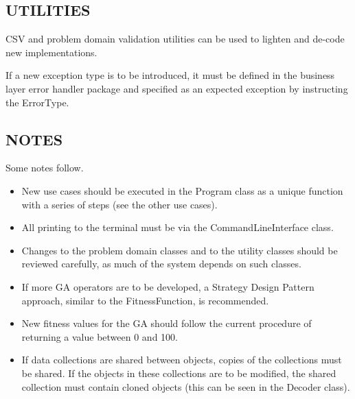 \subsection*{UTILITIES}

CSV and problem domain validation utilities can be used to lighten and de-code new implementations.

If a new exception type is to be introduced, it must be defined in the business layer error handler package and specified as an expected exception by instructing the ErrorType.



\subsection*{NOTES}

Some notes follow.

\begin{itemize}
    \item New use cases should be executed in the Program class as a unique function with a series of steps (see the other use cases).
    \item All printing to the terminal must be via the CommandLineInterface class.
    \item Changes to the problem domain classes and to the utility classes should be reviewed carefully, as much of the system depends on such classes. 
    \item If more GA operators are to be developed, a Strategy Design Pattern approach, similar to the FitnessFunction, is recommended.
    \item New fitness values for the GA should follow the current procedure of returning a value between 0 and 100.
    \item If data collections are shared between objects, copies of the collections must be shared. If the objects in these collections are to be modified, the shared collection must contain cloned objects (this can be seen in the Decoder class).
\end{itemize}


